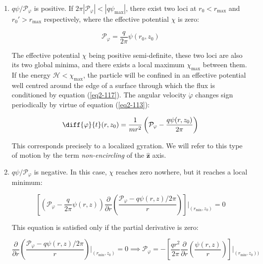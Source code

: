 \begin{enumerate}
    \item $q\psi/\mathcal{P}_\varphi$ is positive. If $2\pi|\mathcal{P}_\varphi|<|q\psi_\text{max}|$, there exist two loci at $r_0<r_\text{max}$ and $r_0'>r_\text{max}$ respectively, where the effective potential $\chi$ is zero:

    \begin{equation}
        \label{eq2-117}
        \mathcal{P}_\varphi=\frac{q}{2\pi}\psi(r_0,z_0)
    \end{equation}

    The effective potential $\chi$ being positive semi-definite, these two loci are also its two global minima, and there exists a local maximum $\chi_\text{max}$ between them. If the energy $\mathcal{H}<\chi_\text{max}$, the particle will be confined in an effective potential well centred around the edge of a surface through which the flux is conditioned by equation (\ref{eq2-117}). The angular velocity $\dot{\varphi}$ changes sign periodically by virtue of equation (\ref{eq2-113}):

    \begin{equation}
        \diff{\varphi}{t}(r,z_0)=\frac{1}{mr^2}\left(\mathcal{P}_\varphi-\frac{q\psi(r,z_0)}{2\pi}\right)
    \end{equation}

    This corresponds precisely to a localized gyration. We will refer to this type of motion by the term \textit{non-encircling} of the $\mathbf{\hat{z}}$ axis.
    
    \item $q\psi/\mathcal{P}_\varphi$ is negative. In this case, $\chi$ reaches zero nowhere, but it reaches a local minimum:

    \begin{equation}
        \left[\left(\mathcal{P}_\varphi-\frac{q}{2\pi}\psi(r,z)\right)\frac{\partial}{\partial r}\left(\frac{\mathcal{P}_\varphi-q\psi(r,z)/2\pi}{r}\right)\right]\Biggr|_{(r_\text{min},z_0)}=0
    \end{equation}

    This equation is satisfied only if the partial derivative is zero:

    \begin{equation}
        \label{eq2-120}
        \frac{\partial}{\partial r}\left(\frac{\mathcal{P}_\varphi-q\psi(r,z)/2\pi}{r}\right)\Biggr|_{(r_\text{min},z_0)}=0\implies\mathcal{P}_\varphi=-\left[\frac{qr^2}{2\pi}\frac{\partial}{\partial r}\left(\frac{\psi(r,z)}{r}\right)\right]\Biggr|_{(r_\text{min},z_0))}
    \end{equation}


\end{enumerate}
